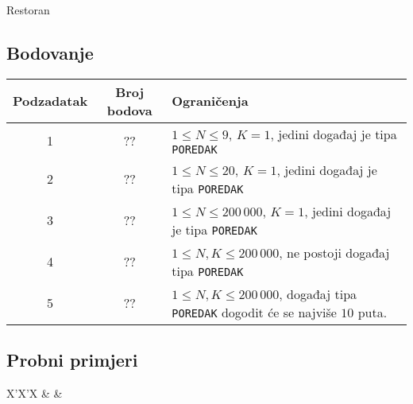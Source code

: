 \begin{statement}[
  problempoints=100,
  timelimit=1 sekunda,
  memorylimit=512 MiB,
]{Restoran}
\subsection*{Bodovanje}
{\renewcommand{\arraystretch}{1.4}
  \setlength{\tabcolsep}{6pt}
  \begin{tabular}{ccl}
 Podzadatak & Broj bodova & Ograničenja \\ \midrule
  1 & ?? & $1 \le N \le 9$, $K = 1$, jedini događaj je tipa \texttt{POREDAK} \\
  2 & ?? & $1 \le N \le 20$, $K = 1$, jedini događaj je tipa \texttt{POREDAK} \\
  3 & ?? & $1 \le N \le 200\,000$, $K = 1$, jedini događaj je tipa \texttt{POREDAK} \\
  4 & ?? & $1 \le N, K \le 200\,000$, ne postoji događaj tipa \texttt{POREDAK} \\
    5 & ?? & $1 \le N, K \le 200\,000$, događaj tipa \texttt{POREDAK} dogodit će se najviše $10$ puta.  \\
\end{tabular}}

\subsection*{Probni primjeri}
\begin{tabularx}{\textwidth}{X'X'X}
 &
 &
\end{tabularx}


\end{statement}

